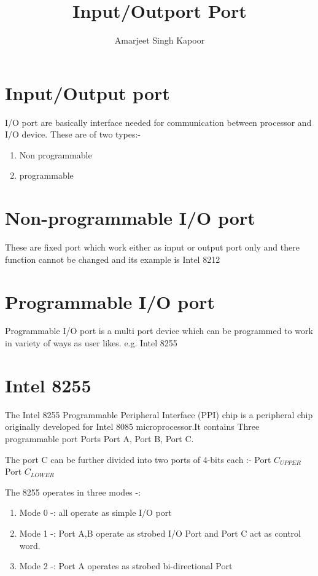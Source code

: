 \documentclass[12pt]{report}
\title{Input/Outport Port}
\author{Amarjeet Singh Kapoor}
\begin{document}
\thispagestyle{plain}
	\begin{titlepage}
\maketitle
	\end{titlepage}
\section{Input/Output port}
 I/O port are basically interface needed for communication between processor and I/O device.
These are of two types:-
\begin{enumerate}
\item Non programmable
\item  programmable
\end{enumerate}

\section{Non-programmable I/O port}
These are fixed port which work either as input or output port only and there function cannot be changed and its example is Intel 8212


\section{Programmable I/O port}
Programmable I/O port is a multi port device which can be programmed to work in variety of ways as user likes. e.g. Intel 8255   

\section{Intel 8255} 
The Intel 8255 Programmable Peripheral Interface (PPI) chip is a peripheral chip originally developed for Intel 8085 microprocessor.It contains Three programmable port Ports Port A, Port B, Port C. 


The port C can be further divided into two ports of 4-bits each :- 
	 Port $C_{{UPPER}}$ Port $C_{{LOWER}}$

The 8255 operates in three modes -:
\begin{enumerate}
\item {Mode 0 -: all operate as simple I/O port }
\item {Mode 1 -: Port A,B operate as strobed I/O Port and Port C 
				act as control word.}
\item	{Mode 2 -: Port A operates as strobed bi-directional Port } \end{enumerate}
		 
\end{document}
